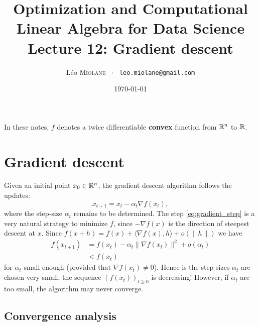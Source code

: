 \documentclass[11pt,nocut]{article}
\title{\vspace{-2.0cm}%
	Optimization and Computational Linear Algebra for Data Science\\
Lecture 12: Gradient descent}
\author{Léo \textsc{Miolane} \ $\cdot$ \ \texttt{leo.miolane@gmail.com}}
\date{\today}
\begin{document}
\maketitle


\begin{center}
In these notes, $f$ denotes a twice differentiable \textbf{convex} function from $\mathbb{R}^n$ to $\mathbb{R}$.
\end{center}

\section{Gradient descent}

Given an initial point $x_0 \in \mathbb{R}^n$, the gradient descent algorithm follows the updates:
\begin{equation}\label{eq:gradient_step}
x_{t+1} = x_t - \alpha_t \nabla f(x_t),
\end{equation}
where the step-size $\alpha_t$ remains to be determined.
The step \eqref{eq:gradient_step} is a very natural strategy to minimize $f$, since $-\nabla f(x)$ is the direction of steepest descent at $x$. Since $f(x+h) = f(x) + \langle \nabla f(x), h \rangle + o(\|h\|)$ we have
\begin{align*}
f(x_{t+1}) 
&= f(x_t) - \alpha_t \| \nabla f(x_t) \|^2 + o(\alpha_t) \\
&< f(x_t) 
\end{align*}
for $\alpha_t$ small enough (provided that $\nabla f(x_t) \neq 0$).
Hence is the step-sizes $\alpha_t$ are chosen very small, the sequence $(f(x_t))_{t \geq 0}$ is decreasing!
However, if $\alpha_t$ are too small, the algorithm may never converge.

\subsection{Convergence analysis}
\end{document}
